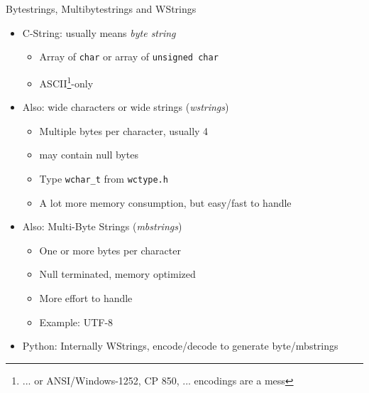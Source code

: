 \begin{frame}{Bytestrings, Multibytestrings and WStrings}
%
\begin{itemize}
\item C-String: usually means \emph{byte string}
	\begin{itemize}
	\item Array of \texttt{char} or array of \texttt{unsigned char}
	\item ASCII\footnote{... or ANSI/Windows-1252, CP 850, ... encodings are a mess}-only
	\end{itemize}
\item Also: wide characters or wide strings (\emph{wstrings})
	\begin{itemize}
	\item Multiple bytes per character, usually 4
	\item[\Thus] may contain null bytes
	\item Type \texttt{wchar\_t} from \texttt{wctype.h}
	\item A lot more memory consumption, but easy/fast to handle 
	\end{itemize}
\item Also: Multi-Byte Strings (\emph{mbstrings})
	\begin{itemize}
	\item One or more bytes per character
	\item Null terminated, memory optimized
	\item More effort to handle
	\item Example: UTF-8
	\end{itemize}
\item Python: Internally WStrings, encode/decode to generate byte/mbstrings
\end{itemize}
%
\end{frame}



